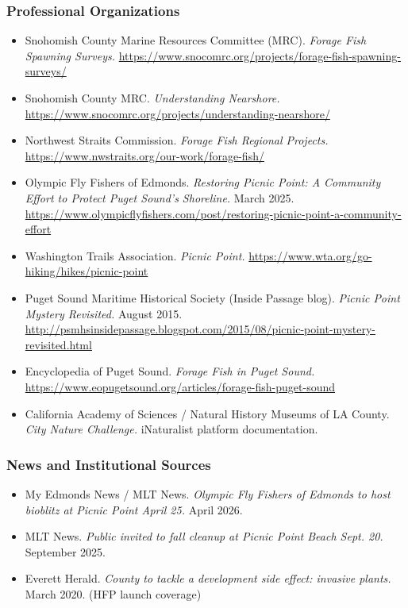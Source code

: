 \documentclass[11pt,letterpaper]{article}
\begin{document}
\subsubsection{Professional Organizations}

\begin{itemize}
  \item Snohomish County Marine Resources Committee (MRC). \textit{Forage Fish Spawning Surveys.} \url{https://www.snocomrc.org/projects/forage-fish-spawning-surveys/}
  \item Snohomish County MRC. \textit{Understanding Nearshore.} \url{https://www.snocomrc.org/projects/understanding-nearshore/}
  \item Northwest Straits Commission. \textit{Forage Fish Regional Projects.} \url{https://www.nwstraits.org/our-work/forage-fish/}
  \item Olympic Fly Fishers of Edmonds. \textit{Restoring Picnic Point: A Community Effort to Protect Puget Sound's Shoreline.} March 2025. \url{https://www.olympicflyfishers.com/post/restoring-picnic-point-a-community-effort}
  \item Washington Trails Association. \textit{Picnic Point.} \url{https://www.wta.org/go-hiking/hikes/picnic-point}
  \item Puget Sound Maritime Historical Society (Inside Passage blog). \textit{Picnic Point Mystery Revisited.} August 2015. \url{http://psmhsinsidepassage.blogspot.com/2015/08/picnic-point-mystery-revisited.html}
  \item Encyclopedia of Puget Sound. \textit{Forage Fish in Puget Sound.} \url{https://www.eopugetsound.org/articles/forage-fish-puget-sound}
  \item California Academy of Sciences / Natural History Museums of LA County. \textit{City Nature Challenge.} iNaturalist platform documentation.
\end{itemize}

\subsubsection{News and Institutional Sources}

\begin{itemize}
  \item My Edmonds News / MLT News. \textit{Olympic Fly Fishers of Edmonds to host bioblitz at Picnic Point April 25.} April 2026.
  \item MLT News. \textit{Public invited to fall cleanup at Picnic Point Beach Sept. 20.} September 2025.
  \item Everett Herald. \textit{County to tackle a development side effect: invasive plants.} March 2020. (HFP launch coverage)
\end{itemize}
\end{document}
